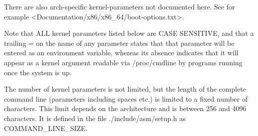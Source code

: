 \documentclass[a4paper,8pt,english]{sphinxmanual}
\begin{document}
There are also arch-specific kernel-parameters not documented here.
See for example \textless{}Documentation/x86/x86\_64/boot-options.txt\textgreater{}.

Note that ALL kernel parameters listed below are CASE SENSITIVE, and that
a trailing = on the name of any parameter states that that parameter will
be entered as an environment variable, whereas its absence indicates that
it will appear as a kernel argument readable via /proc/cmdline by programs
running once the system is up.

The number of kernel parameters is not limited, but the length of the
complete command line (parameters including spaces etc.) is limited to
a fixed number of characters. This limit depends on the architecture
and is between 256 and 4096 characters. It is defined in the file
./include/asm/setup.h as COMMAND\_LINE\_SIZE.
\end{document}
